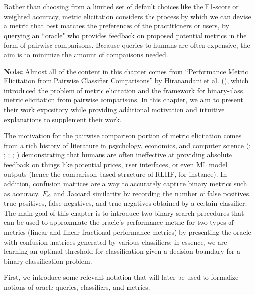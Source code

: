 \documentclass[
  letterpaper,
  numbers=noenddot,
  DIV=11,
  oneside]{scrreprt}
\theoremstyle{remark}
\begin{document}
Rather than choosing from a limited set of default choices like the
F1-score or weighted accuracy, metric elicitation considers the process
by which we can devise a metric that best matches the preferences of the
practitioners or users, by querying an ``oracle" who provides feedback
on proposed potential metrics in the form of pairwise comparisons.
Because queries to humans are often expensive, the aim is to minimize
the amount of comparisons needed.

\textbf{Note:} Almost all of the content in this chapter comes from
``Performance Metric Elicitation from Pairwise Classifier Comparisons''
by Hiranandani et al.
(),
which introduced the problem of metric elicitation and the framework for
binary-class metric elicitation from pairwise comparisons. In this
chapter, we aim to present their work expository while providing
additional motivation and intuitive explanations to supplement their
work.

The motivation for the pairwise comparison portion of metric elicitation
comes from a rich history of literature in psychology, economics, and
computer science (;
; ; ;
) demonstrating that
humans are often ineffective at providing absolute feedback on things
like potential prices, user interfaces, or even ML model outputs (hence
the comparison-based structure of RLHF, for instance). In addition,
confusion matrices are a way to accurately capture binary metrics such
as accuracy, \(F_\beta\), and Jaccard similarity by recording the number
of false positives, true positives, false negatives, and true negatives
obtained by a certain classifier. The main goal of this chapter is to
introduce two binary-search procedures that can be used to approximate
the oracle's performance metric for two types of metrics (linear and
linear-fractional performance metrics) by presenting the oracle with
confusion matrices generated by various classifiers; in essence, we are
learning an optimal threshold for classification given a decision
boundary for a binary classification problem.

First, we introduce some relevant notation that will later be used to
formalize notions of oracle queries, classifiers, and metrics.
\end{document}
